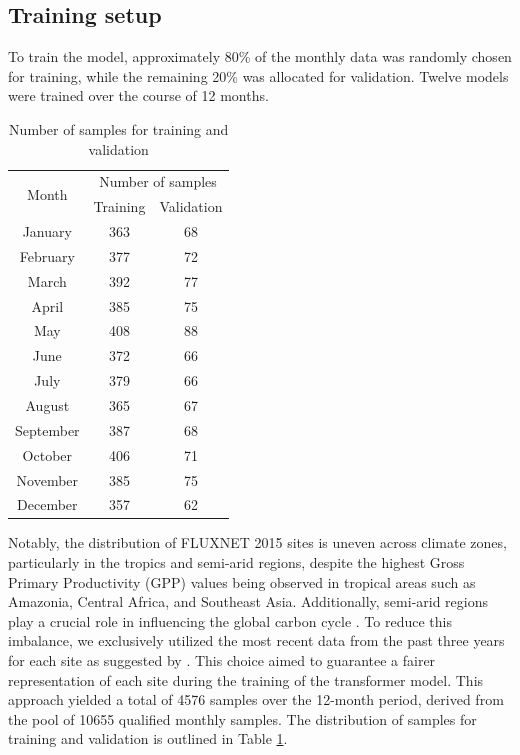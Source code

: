\subsection{Training setup}
To train the model, approximately 80\% of the monthly data was randomly chosen for training, while the remaining 20\% was allocated for validation. Twelve models were trained over the course of 12 months. \par
\begin{table}[!ht]
    \centering
    \caption{Number of samples for training and validation}
    \begin{tabular}{ccc}
        \hline
        \multirow{2}{*}{Month} & \multicolumn{2}{c}{Number of samples} \\ \cline{2-3}
        ~ & Training & Validation \\ \hline
        January & 363 & 68 \\ 
        February & 377 & 72 \\ 
        March & 392 & 77 \\ 
        April & 385 & 75 \\ 
        May & 408 & 88 \\ 
        June & 372 & 66 \\ 
        July & 379 & 66 \\ 
        August & 365 & 67 \\ 
        September & 387 & 68 \\ 
        October & 406 & 71 \\ 
        November & 385 & 75 \\ 
        December & 357 & 62 \\ \hline
    \end{tabular}
    \label{tab:chap6_nosamples}
\end{table}

Notably, the distribution of FLUXNET 2015 sites is uneven across climate zones, particularly in the tropics and semi-arid regions, despite the highest Gross Primary Productivity (GPP) values being observed in tropical areas such as Amazonia, Central Africa, and Southeast Asia\citep{chen2017regional}. Additionally, semi-arid regions play a crucial role in influencing the global carbon cycle \citep{poulter2014contribution}. To reduce this imbalance, we exclusively utilized the most recent data from the past three years for each site as suggested by \citep{zeng2020global}. This choice aimed to guarantee a fairer representation of each site during the training of the transformer model. This approach yielded a total of 4576 samples over the 12-month period, derived from the pool of 10655 qualified monthly samples. The distribution of samples for training and validation is outlined in Table \ref{tab:chap6_nosamples}. \par
